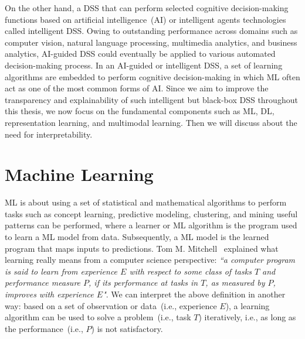 \hspace*{3.5mm} On the other hand, a DSS that can perform selected cognitive decision-making functions based on artificial intelligence~(AI) or intelligent agents technologies called intelligent DSS. Owing to outstanding performance across domains such as computer vision, natural language processing, multimedia analytics, and business analytics, AI-guided DSS could eventually be applied to various automated decision-making process. In an AI-guided or intelligent DSS, a set of learning algorithms are embedded to perform cognitive decision-making in which ML often act as one of the most common forms of AI. 
Since we aim to improve the transparency and explainability of such intelligent but black-box DSS throughout this thesis, we now focus on the fundamental components such as ML, DL, representation learning, and multimodal learning. Then we will discuss about the need for interpretability. 

\section{Machine Learning}
ML is about using a set of statistical and mathematical algorithms to perform tasks such as concept learning, predictive modeling, clustering, and mining useful patterns can be performed, where a learner or ML algorithm is the program used to learn a ML model from data. Subsequently, a ML model is the learned program that maps inputs to predictions. Tom M. Mitchell~\cite{mitchell1997machine} explained what learning really means from a computer science perspective: \textit{``a computer program is said to learn from experience $E$ with respect to some class of tasks $T$ and performance measure $P$, if its performance at tasks in $T$, as measured by $P$, improves with experience $E$"}. We can interpret the above definition in another way: based on a set of observation or data~(i.e., experience $E$), a learning algorithm can be used to solve a problem~(i.e., task $T$) iteratively, i.e., as long as the performance~(i.e., $P$) is not satisfactory. 

